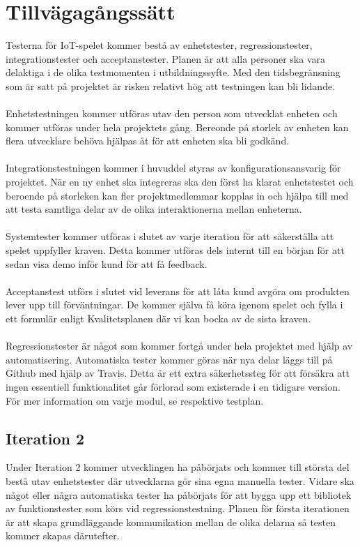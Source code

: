 \section{Tillvägagångssätt}
	Testerna för IoT-spelet kommer bestå av enhetstester, regressionstester, integrationstester och acceptanstester. Planen är att alla personer ska vara delaktiga i de olika 		testmomenten i utbildningssyfte. Med den tidsbegränsning som är satt på projektet är risken relativt hög att testningen kan bli lidande. \\
	\\
	Enhetstestningen kommer utföras utav den person som utvecklat enheten och kommer utföras under hela projektets gång. Bereonde på storlek av enheten kan flera utvecklare behöva hjälpas åt för att enheten ska bli godkänd.\\
	\\
	Integrationstestningen kommer i huvuddel styras av konfigurationsansvarig för projektet. När en ny enhet ska integreras ska den först ha klarat enhetstestet och beroende på storleken kan fler projektmedlemmar kopplas in och hjälpa till med att testa samtliga delar av de olika interaktionerna mellan enheterna. \\
	\\
	Systemtester kommer utföras i slutet av varje iteration för att säkerställa att spelet uppfyller kraven. Detta kommer utföras dels internt till en början för att sedan visa demo inför kund för att få feedback.  \\
	\\
	Acceptanstest utförs i slutet vid leverans för att låta kund avgöra om produkten lever upp till förväntningar. De kommer själva få köra igenom spelet och fylla i ett formulär enligt Kvalitetsplanen där vi kan bocka av de sista kraven. \\
	\\
	Regressionstester är något som kommer fortgå under hela projektet med hjälp av automatisering. Automatiska tester kommer göras när nya delar läggs till på Github med hjälp av Travis. Detta är ett extra säkerhetssteg för att försäkra att ingen essentiell funktionalitet går förlorad som existerade i en tidigare version.\\
	För mer information om varje modul, se respektive testplan.

\subsection{Iteration 2}
	Under Iteration 2 kommer utvecklingen ha påbörjats och kommer till största del bestå utav enhetstester där utvecklarna gör sina egna manuella tester. Vidare ska något eller några automatiska tester ha påbörjats för att bygga upp ett bibliotek av funktionstester som körs vid regressionstestning. Planen för första iterationen är att skapa grundläggande kommunikation mellan de olika delarna så testen kommer skapas därutefter.\\

